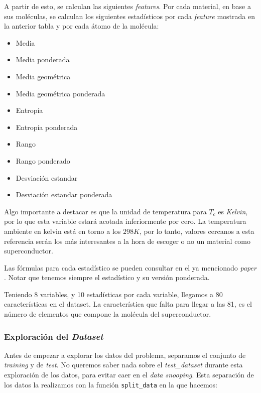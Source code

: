 \documentclass[11pt]{article}
\begin{document}
A partir de esto, se calculan las siguientes \emph{features}. Por cada material, en base a sus moléculas, se calculan los siguientes estadísticos por cada \emph{feature} mostrada en la anterior tabla y por cada átomo de la molécula:


\begin{itemize}
    \item Media
    \item Media ponderada
    \item Media geométrica
    \item Media geométrica ponderada
    \item Entropía
    \item Entropía ponderada
    \item Rango
    \item Rango ponderado
    \item Desviación estandar
    \item Desviación estandar ponderada
\end{itemize}

Algo importante a destacar es que la unidad de temperatura para $T_c$ es \emph{Kelvin}, por lo que esta variable estará acotada inferiormente por cero. La temperatura ambiente en kelvin está en torno a los $298K$, por lo tanto, valores cercanos a esta referencia serán los más interesantes a la hora de escoger o no un material como superconductor.

Las fórmulas para cada estadístico se pueden consultar en el ya mencionado \emph{paper} \cite{original_paper_reg:paper}. Notar que tenemos siempre el estadístico y su versión ponderada.

Teniendo 8 variables, y 10 estadísticas por cada variable, llegamos a 80 características en el dataset. La característica que falta para llegar a las 81, es el número de elementos que compone la molécula del superconductor.

\subsubsection{Exploración del \emph{Dataset}}

Antes de empezar a explorar los datos del problema, separamos el conjunto de \emph{training} y de \emph{test}. No queremos saber nada sobre el \emph{test\_dataset} durante esta exploración de los datos, para evitar caer en el \emph{data snooping}. Esta separación de los datos la realizamos con la función \lstinline{split_data} en la que hacemos:
\end{document}
